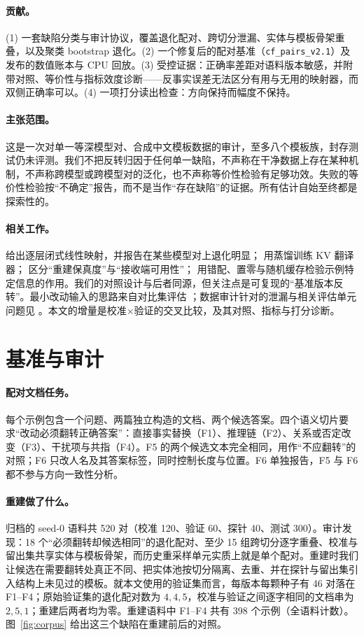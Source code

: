\documentclass[11pt]{article}
\begin{document}
\paragraph{贡献。}
(1) 一套缺陷分类与审计协议，覆盖退化配对、跨切分泄漏、实体与模板骨架重叠，以及聚类 bootstrap 退化。(2) 一个修复后的配对基准（\texttt{cf\_pairs\_v2.1}）及发布的数值账本与 CPU 回放。(3) 受控证据：正确率差距对语料版本敏感，并附带对照、等价性与指标效度诊断——反事实误差无法区分有用与无用的映射器，而双侧正确率可以。(4) 一项打分读出检查：方向保持而幅度不保持。

\paragraph{主张范围。}
这是一次对单一等深模型对、合成中文模板数据的审计，至多八个模板族，封存测试仍未评测。我们不把反转归因于任何单一缺陷，不声称在干净数据上存在某种机制，不声称跨模型或跨模型对的泛化，也不声称等价性检验有足够功效。失败的等价性检验按“不确定”报告，而不是当作“存在缺陷”的证据。所有估计自始至终都是探索性的。

\paragraph{相关工作。}
\citet{heo2026} 给出逐层闭式线性映射，并报告在某些模型对上退化明显；\citet{kvlingo} 用蒸馏训练 KV 翻译器；\citet{cachelink} 区分“重建保真度”与“接收端可用性”；\citet{cheng2026} 用错配、置零与随机缓存检验示例特定信息的作用。我们的对照设计与后者同源，但关注点是可复现的“基准版本反转”。最小改动输入的思路来自对比集评估 \citep{contrastsets}；数据审计针对的泄漏与相关评估单元问题见 \citet{kapoor2023}。本文的增量是校准$\times$验证的交叉比较，及其对照、指标与打分诊断。

\section{基准与审计}

\paragraph{配对文档任务。}
每个示例包含一个问题、两篇独立构造的文档、两个候选答案。四个语义切片要求“改动必须翻转正确答案”：直接事实替换（F1）、推理链（F2）、关系或否定改变（F3）、干扰项与共指（F4）。F5 的两个候选文本完全相同，用作“不应翻转”的对照；F6 只改人名及其答案标签，同时控制长度与位置。F6 单独报告，F5 与 F6 都不参与方向一致性分析。

\paragraph{重建做了什么。}
归档的 seed-0 语料共 520 对（校准 120、验证 60、探针 40、测试 300）。审计发现：18 个“必须翻转却候选相同”的退化配对、至少 15 组跨切分逐字重叠、校准与留出集共享实体与模板骨架，而历史重采样单元实质上就是单个配对。重建时我们让候选在需要翻转处真正不同、把实体池按切分隔离、去重、并在探针与留出集引入结构上未见过的模板。就本文使用的验证集而言，每版本每颗种子有 46 对落在 F1--F4；原始验证集的退化配对数为 $4,4,5$，校准与验证之间逐字相同的文档串为 $2,5,1$；重建后两者均为零。重建语料中 F1--F4 共有 398 个示例（全语料计数）。图~\ref{fig:corpus} 给出这三个缺陷在重建前后的对照。
\end{document}
